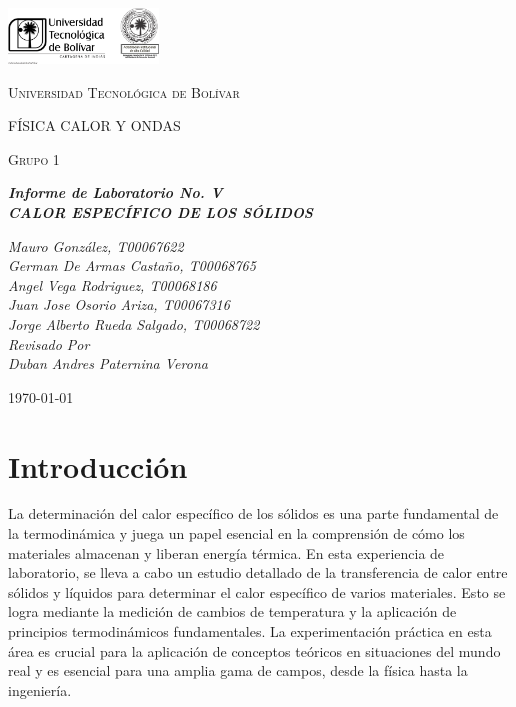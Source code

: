 \documentclass[letterpaper, 12pt]{article}
\begin{document}
\begin{titlepage}
      \centering
      \includegraphics[width=0.3\textwidth]{Images/logo_utb.png}\par\vspace{1cm}
      {\scshape\LARGE Universidad Tecnológica de Bolívar \par}
      \vspace{1cm}

      {\scshape\Large FÍSICA CALOR Y ONDAS \par}
      \vspace{.2cm}

      {\scshape\Large Grupo 1 \par}
      \vspace{1cm}
      \slshape {\Large \bfseries{}Informe de Laboratorio No. V\\}
      \slshape {\small \bfseries{}CALOR ESPECÍFICO DE LOS SÓLIDOS}
      \vspace{2cm}

      \slshape {\itshape{} Mauro González, T00067622 \\}
      \slshape {\itshape{} German De Armas Castaño, T00068765 \\}
      \slshape {\itshape{} Angel Vega Rodriguez, T00068186 \\}
      \slshape {\itshape{} Juan Jose Osorio Ariza, T00067316 \\}
      \slshape {\itshape{} Jorge Alberto Rueda Salgado, T00068722 \\}
      \vfill
      Revisado Por \\
      Duban Andres Paternina Verona\\
      {\large \today\par}
\end{titlepage}


\section{Introducción}

La determinación del calor específico de los sólidos es una
parte fundamental de la termodinámica y juega un papel
esencial en la comprensión de cómo los materiales almacenan
y liberan energía térmica. En esta experiencia de
laboratorio, se lleva a cabo un estudio detallado de la
transferencia de calor entre sólidos y líquidos para
determinar el calor específico de varios materiales. Esto
se logra mediante la medición de cambios de temperatura y
la aplicación de principios termodinámicos fundamentales.
La experimentación práctica en esta área es crucial para la
aplicación de conceptos teóricos en situaciones del mundo
real y es esencial para una amplia gama de campos, desde la
física hasta la ingeniería.
\end{document}
